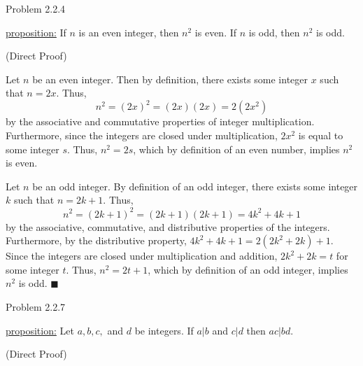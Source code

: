 \documentclass{article}
\theoremstyle{definition}
\begin{document}
	\vspace{1cm}


	\noindent Problem 2.2.4  \vspace{0.3cm}


	\underline{proposition:} If $n$ is an even integer, then $n^2$ is
	even. If $n$ is odd, then $n^2$ is odd.

	\vspace{0.4cm}

	 (Direct Proof)

	\vspace{0.2cm}

	Let $n$ be an even integer. Then by definition, there exists some
	integer $x$ such that $n=2x$. Thus, $$n^2=(2x)^2=(2x)(2x)=2(2x^2)$$
	by the associative and commutative properties of integer
	multiplication. Furthermore, since the integers are closed under
	multiplication, $2x^2$ is equal to some integer $s$. Thus,
	$n^2=2s$, which by definition of an even number, implies $n^2$ is
	even.

	\vspace{0.2cm}

	Let $n$ be an odd integer. By definition of an odd integer, there
	exists some integer $k$ such that $n=2k+1$. Thus,
	$$n^2=(2k+1)^2=(2k+1)(2k+1)=4k^2+4k+1$$ by the associative,
	commutative, and distributive properties of the integers.
	Furthermore, by the distributive property, $4k^2+4k+1=2(2k^2+2k)+1$.
	Since the integers are closed under multiplication and addition,
	$2k^2+2k=t$ for some integer $t$. Thus, $n^2=2t+1$, which by
	definition of an odd integer, implies $n^2$ is odd. $\blacksquare$

	\vspace{1cm}




	\noindent Problem 2.2.7  \vspace{0.3cm}

	\underline{proposition:} Let $a, b, c,$ and $d$ be integers. If
	$a|b$ and $c|d$ then $ac|bd$.

	\vspace{0.4cm}

	 (Direct Proof)

	\vspace{0.2cm}
\end{document}
